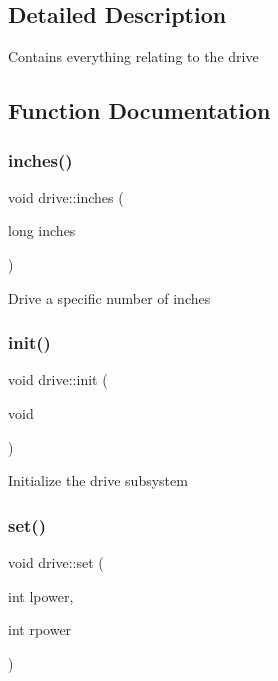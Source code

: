 \subsection{Detailed Description}
Contains everything relating to the drive 

\subsection{Function Documentation}
\mbox{\label{namespacedrive_ab1c99e0f944b404b036034bac0074ca6}} 
\subsubsection{\texorpdfstring{inches()}{inches()}}
{\footnotesize\ttfamily void drive\+::inches (\begin{DoxyParamCaption}\item[{long}]{inches }\end{DoxyParamCaption})}

Drive a specific number of inches \mbox{\label{namespacedrive_afb11be06c88e18373ad210a65e146d53}} 
\subsubsection{\texorpdfstring{init()}{init()}}
{\footnotesize\ttfamily void drive\+::init (\begin{DoxyParamCaption}\item[{void}]{ }\end{DoxyParamCaption})}

Initialize the drive subsystem \mbox{\label{namespacedrive_a2df65772c3853804f68f3358b04420b2}} 
\subsubsection{\texorpdfstring{set()}{set()}}
{\footnotesize\ttfamily void drive\+::set (\begin{DoxyParamCaption}\item[{int}]{lpower,  }\item[{int}]{rpower }\end{DoxyParamCaption})}

